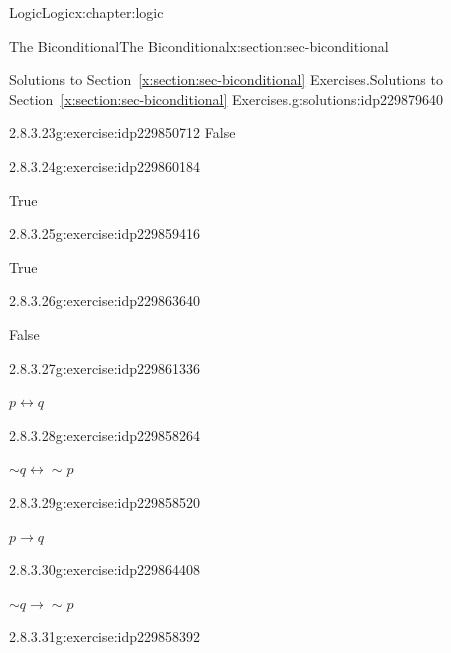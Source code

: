 \documentclass[twoside,10pt,]{book}
\newcommand{\xreffont}{\relax}
\numberwithin{equation}{section}
\newcommand{\conditional}{{p {\rightarrow} q}}
\newcommand{\contrapositive}{{\sim\!{q}{} {\rightarrow} \sim\!{p}{}}}
\newcommand{\biconditional}{{p {\leftrightarrow}{} q}}
\begin{document}
\begin{chapterptx}{Logic}{}{Logic}{}{}{x:chapter:logic}
\begin{sectionptx}{The Biconditional}{}{The Biconditional}{}{}{x:section:sec-biconditional}
\begin{solutions-subsection}{Solutions to Section~{\xreffont\ref*{x:section:sec-biconditional}} Exercises.}{}{Solutions to Section~{\xreffont\ref*{x:section:sec-biconditional}} Exercises.}{}{}{g:solutions:idp229879640}
\begin{exercisegroup}
\begin{divisionsolutioneg}{2.8.3.23}{}{g:exercise:idp229850712}
\noindent\hypertarget{g:solution:idp229865176-main}{}False\end{divisionsolutioneg}%
\begin{divisionsolutioneg}{2.8.3.24}{}{g:exercise:idp229860184}%
\par\smallskip%
\noindent\hypertarget{g:solution:idp229859160-main}{}True\end{divisionsolutioneg}%
\begin{divisionsolutioneg}{2.8.3.25}{}{g:exercise:idp229859416}%
\par\smallskip%
\noindent\hypertarget{g:solution:idp229860312-main}{}True\end{divisionsolutioneg}%
\begin{divisionsolutioneg}{2.8.3.26}{}{g:exercise:idp229863640}%
\par\smallskip%
\noindent\hypertarget{g:solution:idp229861592-main}{}False\end{divisionsolutioneg}%
\end{exercisegroup}
\par\medskip\noindent
\begin{exercisegroup}
\begin{divisionsolutioneg}{2.8.3.27}{}{g:exercise:idp229861336}%
\par\smallskip%
\noindent\hypertarget{g:solution:idp229860440-main}{}\(\biconditional\)\end{divisionsolutioneg}%
\begin{divisionsolutioneg}{2.8.3.28}{}{g:exercise:idp229858264}%
\par\smallskip%
\noindent\hypertarget{g:solution:idp229862616-main}{}\(\sim\!{q}{\leftrightarrow}\sim\!{p}\)\end{divisionsolutioneg}%
\begin{divisionsolutioneg}{2.8.3.29}{}{g:exercise:idp229858520}%
\par\smallskip%
\noindent\hypertarget{g:solution:idp229862872-main}{}\(\conditional\)\end{divisionsolutioneg}%
\begin{divisionsolutioneg}{2.8.3.30}{}{g:exercise:idp229864408}%
\par\smallskip%
\noindent\hypertarget{g:solution:idp229864024-main}{}\(\contrapositive\)\end{divisionsolutioneg}%
\end{exercisegroup}
\par\medskip\noindent
\begin{exercisegroup}
\begin{divisionsolutioneg}{2.8.3.31}{}{g:exercise:idp229858392}%

\end{divisionsolutioneg}
\end{exercisegroup}
\end{solutions-subsection}
\end{sectionptx}
\end{chapterptx}
\end{document}
